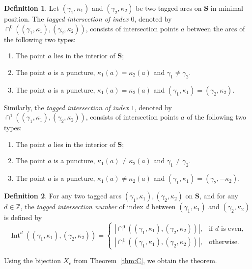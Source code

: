 \documentclass[11pt,a4paper,reqno]{amsart}%
\theoremstyle{plain}
\theoremstyle{definition}
\newtheorem{definition}[definition]{Definition}
\numberwithin{equation}{section}
\numberwithin{equation}{section}
\def\ZZ{\mathbb{Z}}
\newcommand{\Int}{\operatorname{Int}\nolimits}
\def\surf{\mathbf{S}} %
\def\surf{\mathbf{S}}                       %
\begin{document}
 \begin{definition}\label{def:oint}
Let $(\gamma_1,\kappa_1)$ and $(\gamma_2,\kappa_2)$ be two tagged arcs on $\surf$ in minimal position.
The \emph{tagged intersection of index $0$}, denoted by $\cap^0((\gamma_1,\kappa_1),(\gamma_2,\kappa_2))$,    
consists of intersection points $a$ between the arcs of the following two types:
\begin{enumerate}
    \item[(I)] The point $a$ lies in the interior of $\surf$;
    \item[(II)] The point $a$ is a puncture, $\kappa_1(a)=\kappa_2(a)$ and $\gamma_1\ne \gamma_2$.
    \item[(III)] The point $a$ is a puncture, $\kappa_1(a)=\kappa_2(a)$ and $(\gamma_1,\kappa_1)=(\gamma_2,\kappa_2)$.
\end{enumerate}
Similarly, the \emph{tagged intersection of index $1$}, denoted by
$\cap^1((\gamma_1,\kappa_1),(\gamma_2,\kappa_2))$,  
consists of intersection points $a$ of the following two types:
\begin{enumerate}
    \item[(I)] The point $a$ lies in the interior of $\surf$;
    \item[(II)] The point $a$ is a puncture,  $\kappa_1(a)\neq\kappa_2(a)$  and $\gamma_1\ne \gamma_2$.
    \item[(III)] The point $a$ is a puncture, $\kappa_1(a)\ne\kappa_2(a)$ and $(\gamma_1,\kappa_1)=(\gamma_2,-\kappa_2)$.
\end{enumerate}
\end{definition}
   
\begin{definition}
   For  any two tagged  arcs   $(\gamma_1,\kappa_1),(\gamma_2,\kappa_2)$ on $\surf$, and for any $d\in\ZZ$,  the \emph{tagged intersection number}  of index $d$ between  $(\gamma_1,\kappa_1)$ and $(\gamma_2,\kappa_2)$    is   defined by
    \[
     \Int^d((\gamma_1,\kappa_1),(\gamma_2,\kappa_2))=\begin{cases}
         |\cap^0((\gamma_1,\kappa_1),(\gamma_2,\kappa_2))|, & \text{if $d$ is even,}\\
         |\cap^1((\gamma_1,\kappa_1),(\gamma_2,\kappa_2))|, & \text{otherwise.} 
     \end{cases}
    \]
\end{definition}

Using the bijection $X_c$ from Theorem~\ref{thm:C}, we obtain the theorem.

 
\end{document}
